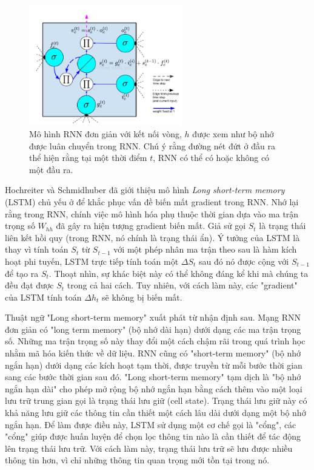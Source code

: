\begin{figure}
	\centering
	\includegraphics[width=0.6\textwidth]{lstmCell}
	\caption[Một "LSTM cell"]{Mô hình RNN đơn giản với kết nối vòng, \textbf{$h$} được xem như bộ nhớ được luân chuyển trong RNN. Chú ý rằng đường nét đứt ở đầu ra thể hiện rằng tại một thời điểm $t$, RNN có thể có hoặc không có một đầu ra.}
	\label{fig_lstmCell}
\end{figure}

Hochreiter và Schmidhuber \cite{hochreiter1997} đã giới thiệu mô hình \textit{Long short-term memory} (LSTM) chủ yếu ở để khắc phục vấn đề biến mất gradient trong RNN. Nhớ lại rằng trong RNN, chính việc mô hình hóa phụ thuộc thời gian dựa vào ma trận trọng số $W_{hh}$ đã gây ra hiện tượng gradient biến mất. Giả sử gọi $S_t$ là trạng thái liên kết hồi quy (trong RNN, nó chính là trạng thái ẩn). Ý tưởng của LSTM là thay vì tính toán $S_t$ từ $S_{t-1}$ với một phép nhân ma trận theo sau là hàm kích hoạt phi tuyến, LSTM trực tiếp tính toán một $\Delta S_t$ sau đó nó được cộng với $S_{t-1}$ để tạo ra $S_t$. Thoạt nhìn, sự khác biệt này có thể không đáng kể khi mà chúng ta đều đạt được $S_t$ trong cả hai cách. Tuy nhiên, với cách làm này, các "gradient" của LSTM tính toán $\Delta h_t$ sẽ không bị biến mất.

Thuật ngữ "Long short-term memory" xuất phát từ nhận định sau. Mạng RNN đơn giản có "long term memory" (bộ nhớ dài hạn) dưới dạng các ma trận trọng số. Những ma trận trọng số này thay đổi một cách chậm rãi trong quá trình học nhằm mã hóa kiến thức về dữ liệu. RNN cũng có "short-term memory" (bộ nhớ ngắn hạn) dưới dạng các kích hoạt tạm thời, được truyền từ mỗi bước thời gian sang các bước thời gian sau đó. "Long short-term memory" tạm dịch là "bộ nhớ ngắn hạn dài" cho phép mở rộng bộ nhớ ngắn hạn bằng cách thêm vào một loại lưu trữ trung gian gọi là trạng thái lưu giữ (cell state). Trạng thái lưu giữ này có khả năng lưu giữ các thông tin cần thiết một cách lâu dài dưới dạng một bộ nhớ ngắn hạn. Để làm được điều này, LSTM sử dụng một cơ chế gọi là "cổng", các "cổng" giúp được huấn luyện để chọn lọc thông tin nào là cần thiết để tác động lên trạng thái lưu trữ. Với cách làm này, trạng thái lưu trữ sẽ lưu được nhiều thông tin hơn, vì chỉ những thông tin quan trọng mới tồn tại trong nó.

